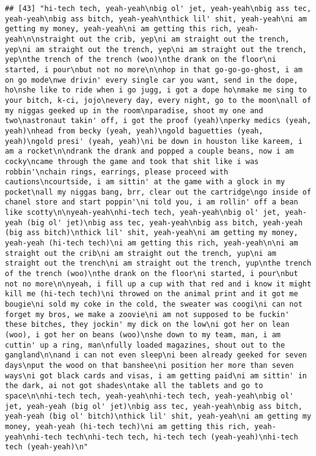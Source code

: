 \documentclass[]{article}
\begin{document}
\begin{verbatim}
## [43] "hi-tech tech, yeah-yeah\nbig ol' jet, yeah-yeah\nbig ass tec, yeah-yeah\nbig ass bitch, yeah-yeah\nthick lil' shit, yeah-yeah\ni am getting my money, yeah-yeah\ni am getting this rich, yeah-yeah\n\nstraight out the crib, yep\ni am straight out the trench, yep\ni am straight out the trench, yep\ni am straight out the trench, yep\nthe trench of the trench (woo)\nthe drank on the floor\ni started, i pour\nbut not no more\n\nhop in that go-go-go-ghost, i am on go mode\nwe drivin' every single car you want, send in the dope, ho\nshe like to ride when i go jugg, i got a dope ho\nmake me sing to your bitch, k-ci, jojo\nevery day, every night, go to the moon\nall of my niggas geeked up in the room\nparadise, shoot my one and two\nastronaut takin' off, i got the proof (yeah)\nperky medics (yeah, yeah)\nhead from becky (yeah, yeah)\ngold baguetties (yeah, yeah)\ngold presi' (yeah, yeah)\ni be down in houston like kareem, i am a rocket\n\ndrank the drank and popped a couple beans, now i am cocky\ncame through the game and took that shit like i was robbin'\nchain rings, earrings, please proceed with cautions\ncourtside, i am sittin' at the game with a glock in my pocket\nall my niggas bang, brr, clear out the cartridge\ngo inside of chanel store and start poppin'\ni told you, i am rollin' off a bean like scotty\n\nyeah-yeah\nhi-tech tech, yeah-yeah\nbig ol' jet, yeah-yeah (big ol' jet)\nbig ass tec, yeah-yeah\nbig ass bitch, yeah-yeah (big ass bitch)\nthick lil' shit, yeah-yeah\ni am getting my money, yeah-yeah (hi-tech tech)\ni am getting this rich, yeah-yeah\n\ni am straight out the crib\ni am straight out the trench, yup\ni am straight out the trench\ni am straight out the trench, yup\nthe trench of the trench (woo)\nthe drank on the floor\ni started, i pour\nbut not no more\n\nyeah, i fill up a cup with that red and i know it might kill me (hi-tech tech)\ni throwed on the animal print and it got me bougie\ni sold my coke in the cold, the sweater was coogi\ni can not forget my bros, we make a zoovie\ni am not supposed to be fuckin' these bitches, they jockin' my dick on the low\ni got her on lean (woo), i got her on beans (woo)\nshe down to my team, man, i am cuttin' up a ring, man\nfully loaded magazines, shout out to the gangland\n\nand i can not even sleep\ni been already geeked for seven days\nput the wood on that banshee\ni position her more than seven ways\ni got black cards and visas, i am getting paid\ni am sittin' in the dark, ai not got shades\ntake all the tablets and go to space\n\nhi-tech tech, yeah-yeah\nhi-tech tech, yeah-yeah\nbig ol' jet, yeah-yeah (big ol' jet)\nbig ass tec, yeah-yeah\nbig ass bitch, yeah-yeah (big ol' bitch)\nthick lil' shit, yeah-yeah\ni am getting my money, yeah-yeah (hi-tech tech)\ni am getting this rich, yeah-yeah\nhi-tech tech\nhi-tech tech, hi-tech tech (yeah-yeah)\nhi-tech tech (yeah-yeah)\n"                                                                                                                                                                                                                                                                                                                                                                                                                                                 
\end{verbatim}
\end{document}
